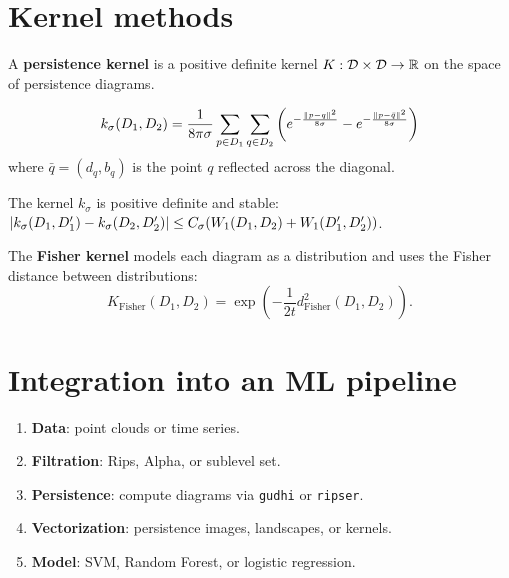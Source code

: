 \section{Kernel methods}
\label{sec:kernels}

\begin{definition}
A \textbf{persistence kernel} is a positive definite kernel
$K : \mathcal{D} \times \mathcal{D} \to \mathbb{R}$ on the space of
persistence diagrams.
\end{definition}

\begin{definition}
\[
  k_\sigma(D_1, D_2) = \frac{1}{8\pi\sigma}
  \sum_{p \in D_1} \sum_{q \in D_2}
  \left(e^{-\frac{\left\| p - q \right\|^2}{8\sigma}}
  - e^{-\frac{\left\| p - \bar{q} \right\|^2}{8\sigma}}\right)
\]
where $\bar{q} = (d_q, b_q)$ is the point $q$ reflected across the
diagonal.
\end{definition}

\begin{proposition}
The kernel $k_\sigma$ is positive definite and stable:
$\left| k_\sigma(D_1, D_1') - k_\sigma(D_2, D_2') \right| \leq
C_\sigma (W_1(D_1, D_2) + W_1(D_1', D_2'))$.
\end{proposition}

\begin{definition}
The \textbf{Fisher kernel} models each diagram as a distribution
and uses the Fisher distance between distributions:
\[
  K_{\mathrm{Fisher}}(D_1, D_2) = \exp\!\left(
  -\frac{1}{2t} d_{\mathrm{Fisher}}^2(D_1, D_2)\right).
\]
\end{definition}

\section{Integration into an ML pipeline}
\label{sec:pipeline}

\begin{example}
\begin{enumerate}
  \item \textbf{Data}: point clouds or time series.
  \item \textbf{Filtration}: Rips, Alpha, or sublevel set.
  \item \textbf{Persistence}: compute diagrams via \texttt{gudhi}
        or \texttt{ripser}.
  \item \textbf{Vectorization}: persistence images, landscapes,
        or kernels.
  \item \textbf{Model}: SVM, Random Forest, or logistic regression.
\end{enumerate}
\end{example}

